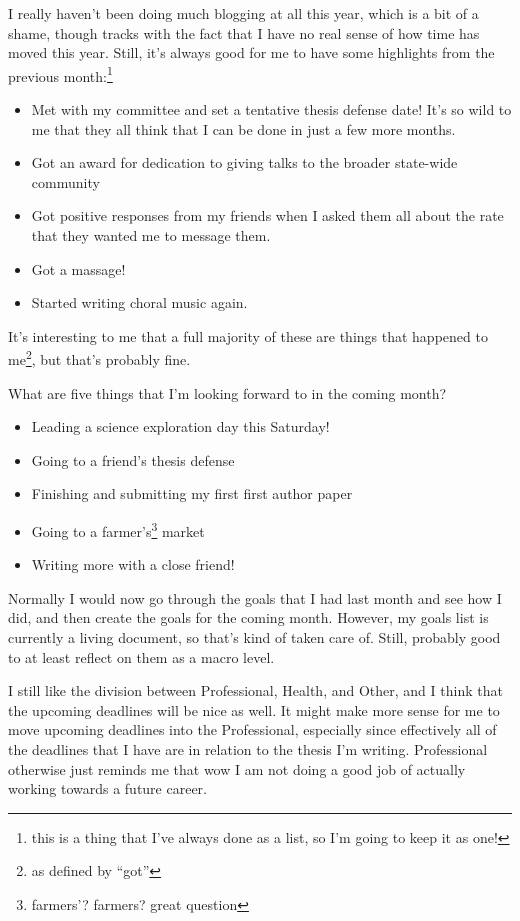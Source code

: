 \documentclass[12pt]{article}[titlepage]
\newcommand{\say}[1]{``#1''}
\renewcommand{\,}{\textsuperscript{,}}
\begin{document}
I really haven't been doing much blogging at all this year, which is a bit of a shame, though tracks with the fact that I have no real sense of how time has moved this year.  
Still, it's always good for me to have some highlights from the previous month:\footnote{this is a thing that I've always done as a list, so I'm going to keep it as one!}

\begin{itemize}  
\item Met with my committee and set a tentative thesis defense date! It's so wild to me that they all think that I can be done in just a few more months.  
\item Got an award for dedication to giving talks to the broader state-wide community  
\item Got positive responses from my friends when I asked them all about the rate that they wanted me to message them.  
\item Got a massage!  
\item Started writing choral music again.  
\end{itemize}

It's interesting to me that a full majority of these are things that happened to me\footnote{as defined by \say{got}}, but that's probably fine.

What are five things that I'm looking forward to in the coming month?  
\begin{itemize}  
\item Leading a science exploration day this Saturday!  
\item Going to a friend's thesis defense  
\item Finishing and submitting my first first author paper  
\item Going to a farmer's\footnote{farmers'? farmers? great question} market  
\item Writing more with a close friend!  
\end{itemize}

Normally I would now go through the goals that I had last month and see how I did, and then create the goals for the coming month.  
However, my goals list is currently a living document, so that's kind of taken care of.  
Still, probably good to at least reflect on them as a macro level.

I still like the division between Professional, Health, and Other, and I think that the upcoming deadlines will be nice as well.  
It might make more sense for me to move upcoming deadlines into the Professional, especially since effectively all of the deadlines that I have are in relation to the thesis I'm writing.  
Professional otherwise just reminds me that wow I am not doing a good job of actually working towards a future career.
\end{document}
